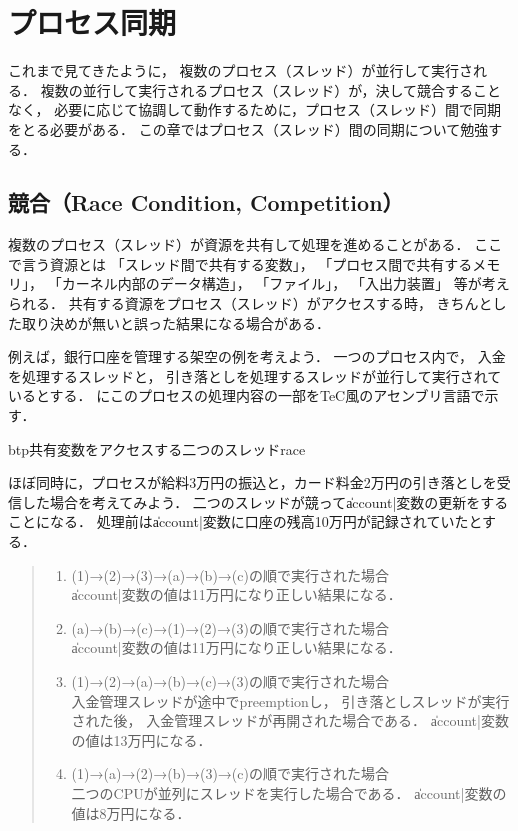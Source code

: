 \chapter{プロセス同期}
\label{synchronaization}
これまで見てきたように，
複数のプロセス（スレッド）が並行して実行される．
複数の並行して実行されるプロセス（スレッド）が，決して競合することなく，
必要に応じて協調して動作するために，プロセス（スレッド）間で同期をとる必要がある．
この章ではプロセス（スレッド）間の同期について勉強する．

\section{競合（Race Condition, Competition）}
複数のプロセス（スレッド）が資源を共有して処理を進めることがある．
ここで言う資源とは
「スレッド間で共有する変数」，
「プロセス間で共有するメモリ」，
「カーネル内部のデータ構造」，
「ファイル」，
「入出力装置」
等が考えられる．
共有する資源をプロセス（スレッド）がアクセスする時，
きちんとした取り決めが無いと誤った結果になる場合がある．

例えば，銀行口座を管理する架空の例を考えよう．
一つのプロセス内で，
入金を処理するスレッドと，
引き落としを処理するスレッドが並行して実行されているとする．
にこのプロセスの処理内容の一部をTeC風のアセンブリ言語で示す．

\begin{myfig}{btp}{共有変数をアクセスする二つのスレッド}{race}

\end{myfig}

ほぼ同時に，プロセスが給料3万円の振込と，カード料金2万円の引き落としを受信した場合を考えてみよう．
二つのスレッドが競って\|account|変数の更新をすることになる．
処理前は\|account|変数に口座の残高10万円が記録されていたとする．

\begin{quote}
\begin{enumerate}
\item (1)→(2)→(3)→(a)→(b)→(c)の順で実行された場合 \\
\|account|変数の値は11万円になり正しい結果になる．

\item (a)→(b)→(c)→(1)→(2)→(3)の順で実行された場合 \\
\|account|変数の値は11万円になり正しい結果になる．

\item (1)→(2)→(a)→(b)→(c)→(3)の順で実行された場合 \\
入金管理スレッドが途中でpreemptionし，
引き落としスレッドが実行された後，
入金管理スレッドが再開された場合である．
\|account|変数の値は13万円になる．

\item (1)→(a)→(2)→(b)→(3)→(c)の順で実行された場合 \\
二つのCPUが並列にスレッドを実行した場合である．
\|account|変数の値は8万円になる．
\end{enumerate}
\end{quote}

